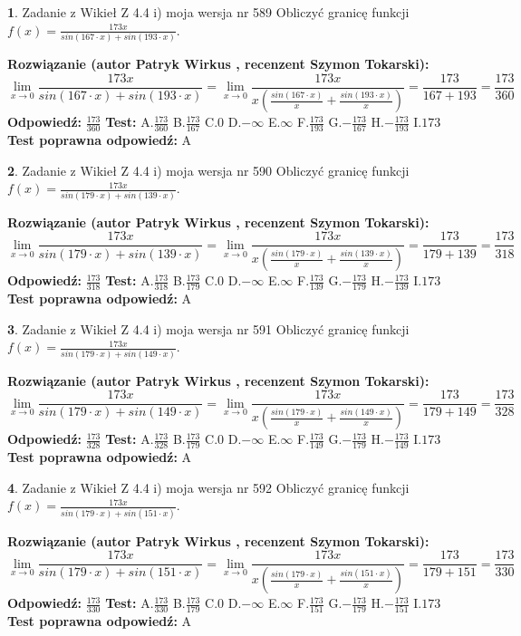 \documentclass[12pt, a4paper]{article}
\theoremstyle{definition} %
\newtheorem{zad}{}
\newcommand{\zadStart}[1]{\begin{zad}#1\newline}
\newcommand{\zadStop}{\end{zad}}
\newcommand{\rozwStart}[2]{\noindent \textbf{Rozwiązanie (autor #1 , recenzent #2): }\newline}
\newcommand{\rozwStop}{\newline}
\newcommand{\odpStart}{\noindent \textbf{Odpowiedź:}\newline}
\newcommand{\odpStop}{\newline}
\newcommand{\testStart}{\noindent \textbf{Test:}\newline}
\newcommand{\testStop}{\newline}
\newcommand{\kluczStart}{\noindent \textbf{Test poprawna odpowiedź:}\newline}
\newcommand{\kluczStop}{\newline}
\begin{document}
\zadStart{Zadanie z Wikieł Z 4.4 i) moja wersja nr 589}
Obliczyć granicę funkcji $f(x)=\frac{173x}{sin(167\cdot x) +sin(193\cdot x)}$.
\zadStop
\rozwStart{Patryk Wirkus}{Szymon Tokarski}
$$\lim\limits_{x\to 0}\frac{173x}{sin(167\cdot x) +sin(193\cdot x)}=\lim\limits_{x\to 0}\frac{173x}{x(\frac{sin(167\cdot x)}{x}+\frac{sin(193\cdot x)}{x})}=\frac{173}{167+193} = \frac{173}{360}$$
\rozwStop
\odpStart
$\frac{173}{360}$
\odpStop
\testStart
A.$\frac{173}{360}$
B.$\frac{173}{167}$
C.$0$
D.$-\infty$
E.$\infty$
F.$\frac{173}{193}$
G.$-\frac{173}{167}$
H.$-\frac{173}{193}$
I.$173$
\testStop
\kluczStart
A
\kluczStop



\zadStart{Zadanie z Wikieł Z 4.4 i) moja wersja nr 590}
Obliczyć granicę funkcji $f(x)=\frac{173x}{sin(179\cdot x) +sin(139\cdot x)}$.
\zadStop
\rozwStart{Patryk Wirkus}{Szymon Tokarski}
$$\lim\limits_{x\to 0}\frac{173x}{sin(179\cdot x) +sin(139\cdot x)}=\lim\limits_{x\to 0}\frac{173x}{x(\frac{sin(179\cdot x)}{x}+\frac{sin(139\cdot x)}{x})}=\frac{173}{179+139} = \frac{173}{318}$$
\rozwStop
\odpStart
$\frac{173}{318}$
\odpStop
\testStart
A.$\frac{173}{318}$
B.$\frac{173}{179}$
C.$0$
D.$-\infty$
E.$\infty$
F.$\frac{173}{139}$
G.$-\frac{173}{179}$
H.$-\frac{173}{139}$
I.$173$
\testStop
\kluczStart
A
\kluczStop



\zadStart{Zadanie z Wikieł Z 4.4 i) moja wersja nr 591}
Obliczyć granicę funkcji $f(x)=\frac{173x}{sin(179\cdot x) +sin(149\cdot x)}$.
\zadStop
\rozwStart{Patryk Wirkus}{Szymon Tokarski}
$$\lim\limits_{x\to 0}\frac{173x}{sin(179\cdot x) +sin(149\cdot x)}=\lim\limits_{x\to 0}\frac{173x}{x(\frac{sin(179\cdot x)}{x}+\frac{sin(149\cdot x)}{x})}=\frac{173}{179+149} = \frac{173}{328}$$
\rozwStop
\odpStart
$\frac{173}{328}$
\odpStop
\testStart
A.$\frac{173}{328}$
B.$\frac{173}{179}$
C.$0$
D.$-\infty$
E.$\infty$
F.$\frac{173}{149}$
G.$-\frac{173}{179}$
H.$-\frac{173}{149}$
I.$173$
\testStop
\kluczStart
A
\kluczStop



\zadStart{Zadanie z Wikieł Z 4.4 i) moja wersja nr 592}
Obliczyć granicę funkcji $f(x)=\frac{173x}{sin(179\cdot x) +sin(151\cdot x)}$.
\zadStop
\rozwStart{Patryk Wirkus}{Szymon Tokarski}
$$\lim\limits_{x\to 0}\frac{173x}{sin(179\cdot x) +sin(151\cdot x)}=\lim\limits_{x\to 0}\frac{173x}{x(\frac{sin(179\cdot x)}{x}+\frac{sin(151\cdot x)}{x})}=\frac{173}{179+151} = \frac{173}{330}$$
\rozwStop
\odpStart
$\frac{173}{330}$
\odpStop
\testStart
A.$\frac{173}{330}$
B.$\frac{173}{179}$
C.$0$
D.$-\infty$
E.$\infty$
F.$\frac{173}{151}$
G.$-\frac{173}{179}$
H.$-\frac{173}{151}$
I.$173$
\testStop
\kluczStart
A
\kluczStop
\end{document}
